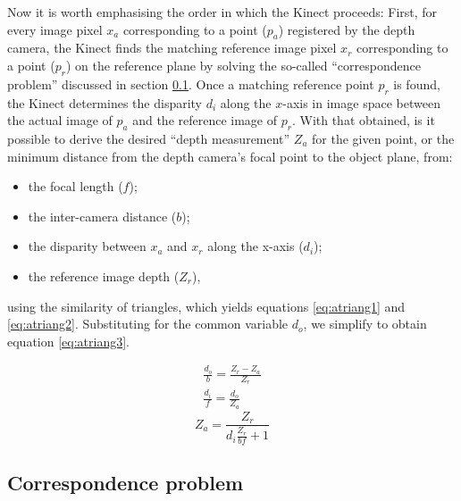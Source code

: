 Now it is worth emphasising the order in which the Kinect proceeds: First, for
every image pixel $x_a$ corresponding to a point ($p_a$) registered by the depth
camera, the Kinect finds the matching reference image pixel $x_r$ corresponding
to a point ($p_r$) on the reference plane by solving the so-called
``correspondence problem'' discussed in section \ref{sub:corr}. Once a matching
reference point $p_r$ is found, the Kinect determines the disparity $d_i$ along
the $x$-axis in image space between the actual image of $p_a$ and the reference
image of $p_r$. With that obtained, is it possible to derive the desired ``depth
measurement'' $Z_a$ for the given point, or the minimum distance from the depth
camera's focal point to the object plane, from: 

\begin{itemize}

    \item the focal length ($f$);

    \item the inter-camera distance ($b$);

    \item the disparity between $x_a$ and $x_r$ along the x-axis ($d_i$);

    \item the reference image depth ($Z_r$),

\end{itemize}
using the similarity of triangles, which yields equations \ref{eq:atriang1} and
\ref{eq:atriang2}. Substituting for the common variable $d_o$, we simplify to
obtain equation \ref{eq:atriang3}.

\begin{align} 
    \frac{d_o}{b} = \frac{Z_r - Z_a}{Z_r} \label{eq:atriang1}\\
    \frac{d_i}{f} = \frac{d_o}{Z_a} \label{eq:atriang2}
\end{align}
\begin{equation} \label{eq:atriang3}
    Z_a = \frac{Z_r}{d_i \frac{Z_r}{b f} + 1}
\end{equation}



\subsection{Correspondence problem}
\label{sub:corr}

